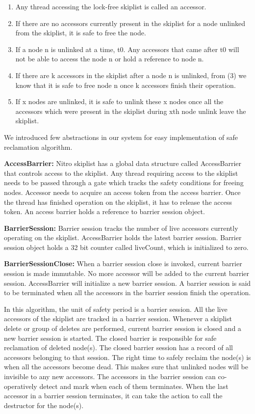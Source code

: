 \documentclass{vldb}
\begin{document}
\begin{enumerate}
  \item Any thread accessing the lock-free skiplist is called an accessor.
  \item If there are no accessors currently present in the skiplist for a node unlinked from the skiplist, it is safe to free the node.
  \item If a node n is unlinked at a time, t0. Any accessors that came after t0 will not be able to access the node n or hold a reference to node n.
  \item If there are k accessors in the skiplist after a node n is unlinked, from (3) we know that it is safe to free node n once k accessors finish their operation.
  \item If x nodes are unlinked, it is safe to unlink these x nodes once all the accessors which were present in the skiplist during xth node unlink leave the skiplist.
\end{enumerate}

We introduced few abstractions in our system for easy implementation of safe reclamation algorithm.

\textbf{AccessBarrier:} Nitro skiplist has a global data structure called AccessBarrier that controls access to the skiplist.
 Any thread requiring access to the skiplist needs to be passed through a gate which tracks the safety conditions for freeing nodes. Accessor needs to acquire an access token from the access barrier. Once the thread has finished operation on the skiplist, it has to release the access token. An access barrier holds a reference to barrier session object.

\textbf{BarrierSession:} Barrier session tracks the number of live accessors currently operating on the skiplist. AccessBarrier holds the latest barrier session. Barrier session object holds a 32 bit counter called liveCount, which is initialized to zero.

\textbf{BarrierSessionClose:} When a barrier session close is invoked, current barrier session is made immutable. No more accessor will be added to the current barrier session. AccessBarrier will initialize a new barrier session. A barrier session is said to be terminated when all the accessors in the barrier session finish the operation.


In this algorithm, the unit of safety period is a barrier session. All the live accessors of the skiplist are tracked in a barrier session. Whenever a skiplist delete or group of deletes are performed, current barrier session is closed and a new barrier session is started. The closed barrier is responsible for safe reclamation of deleted node(s). The closed barrier session has a record of all accessors belonging to that session. The right time to safely reclaim the node(s) is when all the accessors become dead. This makes sure that unlinked nodes will be invisible to any new accessors. The accessors in the barrier session can co-operatively detect and mark when each of them terminates. When the last accessor in a barrier session terminates, it can take the action to call the destructor for the node(s).
\end{document}
